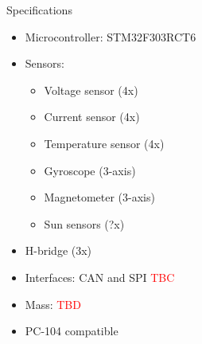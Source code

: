 \documentclass{beamer}
\begin{document}
\begin{frame}{Specifications}

    \begin{itemize}
        \item Microcontroller: STM32F303RCT6 
        \item Sensors:
        \begin{itemize}
            \item Voltage sensor (4x)
            \item Current sensor (4x)
            \item Temperature sensor (4x)
            \item Gyroscope (3-axis)
            \item Magnetometer (3-axis)
            \item Sun sensors (?x)
        \end{itemize}
        \item H-bridge (3x)
        \item Interfaces: CAN and SPI \textcolor{red}{TBC}
        \item Mass: \textcolor{red}{TBD}
        \item PC-104 compatible
    \end{itemize}

\end{frame}
\end{document}
